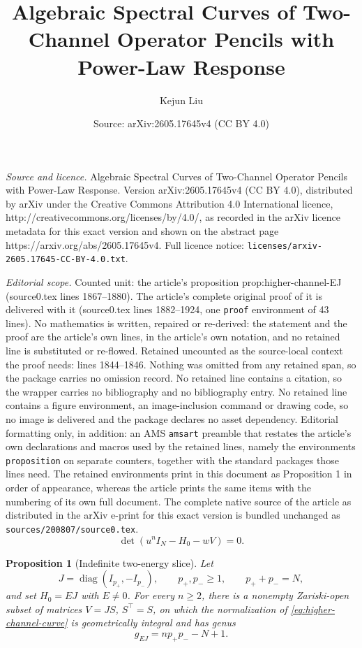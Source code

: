 \documentclass[10pt,a4paper]{amsart}
\title{Algebraic Spectral Curves of Two-Channel Operator Pencils with Power-Law Response}
\author{Kejun Liu}
\date{Source: arXiv:2605.17645v4 (CC BY 4.0)}
\newtheorem{proposition}{Proposition}
\newcommand{\diag}{\operatorname{diag}}
\begin{document}
\maketitle

\noindent\emph{Source and licence.} Algebraic Spectral Curves of Two-Channel Operator Pencils with Power-Law Response. Version arXiv:2605.17645v4 (CC BY 4.0), distributed by arXiv under the Creative Commons Attribution 4.0 International licence, http://creativecommons.org/licenses/by/4.0/, as recorded in the arXiv licence metadata for this exact version and shown on the abstract page https://arxiv.org/abs/2605.17645v4. Full licence notice: \texttt{licenses/arxiv-2605.17645-CC-BY-4.0.txt}.\par\smallskip

\noindent\textit{Editorial scope.} Counted unit: the article's proposition prop:higher-channel-EJ (source0.tex lines 1867--1880). The article's complete original proof of it is delivered with it (source0.tex lines 1882--1924, one \texttt{proof} environment of 43 lines). No mathematics is written, repaired or re-derived: the statement and the proof are the article's own lines, in the article's own notation, and no retained line is substituted or re-flowed.  Retained uncounted as the source-local context the proof needs: lines 1844--1846.  Nothing was omitted from any retained span, so the package carries no omission record.  No retained line contains a citation, so the wrapper carries no bibliography and no bibliography entry.  No retained line contains a figure environment, an image-inclusion command or drawing code, so no image is delivered and the package declares no asset dependency.  Editorial formatting only, in addition: an AMS \texttt{amsart} preamble that restates the article's own declarations and macros used by the retained lines, namely the environments \texttt{proposition} on separate counters, together with the standard packages those lines need.  The retained environments print in this document as Proposition 1 in order of appearance, whereas the article prints the same items with the numbering of its own full document.  The complete native source of the article as distributed in the arXiv e-print for this exact version is bundled unchanged as \texttt{sources/200807/source0.tex}.
\begin{equation}\label{eq:higher-channel-curve}
 \det(u^nI_N-H_0-wV)=0.
\end{equation}

\begin{proposition}[Indefinite two-energy slice]\label{prop:higher-channel-EJ}
Let
\[
 J=\diag(I_{p_+},-I_{p_-}),\qquad
 p_+,p_-\geq1,\qquad p_++p_-=N,
\]
and set $H_0=EJ$ with $E\ne0$.  For every $n\geq2$, there is a
nonempty Zariski-open subset of matrices $V=JS$, $S^\top=S$, on which
the normalization of \eqref{eq:higher-channel-curve} is geometrically
integral and has genus
\begin{equation}\label{eq:higher-channel-EJ-genus}
 \boxed{g_{EJ}=np_+p_--N+1.}
\end{equation}
\end{proposition}
\end{document}
